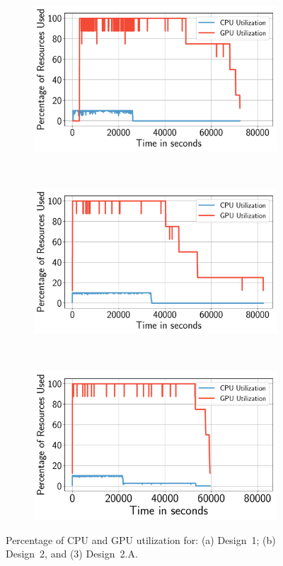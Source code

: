 \begin{figure}[ht!]
	\centering
	\begin{subfigure}[b]{0.33\textwidth}
		\includegraphics[width=\linewidth]{figures/designs/Design1Utilization.pdf}
		\caption{}
		\label{fig:design1util}
	\end{subfigure}%
	~ 
	\begin{subfigure}[b]{0.33\textwidth}
		\includegraphics[width=\linewidth]{figures/designs/Design2Utilization.pdf}
		\caption{}
		\label{fig:design2util}
	\end{subfigure}%
	~ 
	\begin{subfigure}[b]{0.33\textwidth}
		\includegraphics[width=\linewidth]{figures/designs/Design2AUtilization.pdf}
		\caption{}
		\label{fig:design2autil}
	\end{subfigure}
	\caption{Percentage of CPU and GPU utilization for: (a) Design~1; (b)
		Design~2, and (3) Design~2.A.}
	\label{fig:Utilization}
\end{figure}


